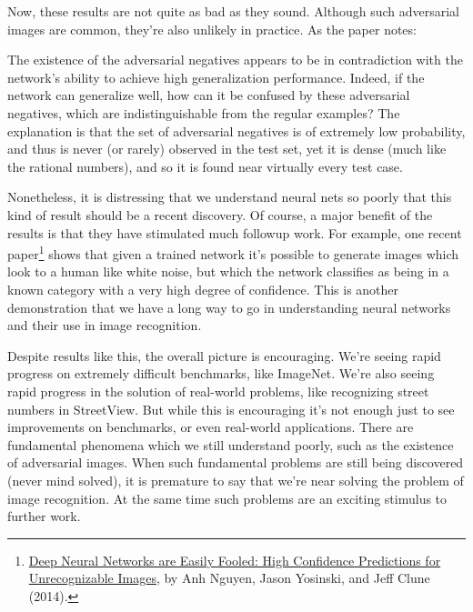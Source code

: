 \documentclass[a4paper,twoside,10pt]{book}
\begin{document}
Now, these results are not quite as bad as they sound. Although such adversarial images are common, they're also unlikely in practice. As the paper notes:
\begin{adjustwidth}{1.5cm}{1cm}
The existence of the adversarial negatives appears to be in contradiction with the network's ability to achieve high generalization performance. Indeed, if the network can generalize well, how can it be confused by these adversarial negatives, which are indistinguishable from the regular examples? The explanation is that the set of adversarial negatives is of extremely low probability, and thus is never (or rarely) observed in the test set, yet it is dense (much like the rational numbers), and so it is found near virtually every test case.
\end{adjustwidth}
Nonetheless, it is distressing that we understand neural nets so poorly that this kind of result should be a recent discovery. Of course, a major benefit of the results is that they have stimulated much followup work. For example, one recent paper\footnote{\href{http://arxiv.org/abs/1412.1897}{Deep Neural Networks are Easily Fooled: High Confidence Predictions for Unrecognizable Images}, by Anh Nguyen, Jason Yosinski, and Jeff Clune (2014).} shows that given a trained network it's possible to generate images which look to a human like white noise, but which the network classifies as being in a known category with a very high degree of confidence. This is another demonstration that we have a long way to go in understanding neural networks and their use in image recognition.

Despite results like this, the overall picture is encouraging. We're seeing rapid progress on extremely difficult benchmarks, like ImageNet. We're also seeing rapid progress in the solution of real-world problems, like recognizing street numbers in StreetView. But while this is encouraging it's not enough just to see improvements on benchmarks, or even real-world applications. There are fundamental phenomena which we still understand poorly, such as the existence of adversarial images. When such fundamental problems are still being discovered (never mind solved), it is premature to say that we're near solving the problem of image recognition. At the same time such problems are an exciting stimulus to further work.
\end{document}

